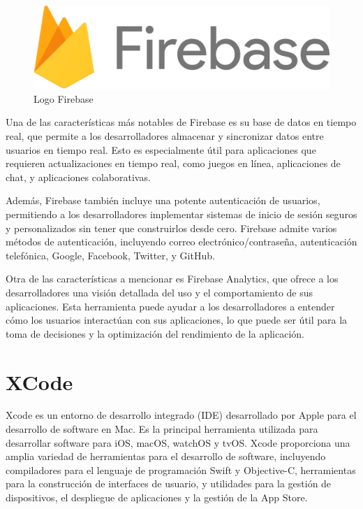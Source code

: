     \begin{figure}[H]
        \centering
        \includegraphics[width=.5\linewidth]{images/1280px-Firebase_Logo.svg.png}
        \caption{Logo Firebase}
        \label{fig:Logo Firebase}
    \end{figure}

    Una de las características más notables de Firebase es su base de datos en tiempo real, que permite a los desarrolladores almacenar y sincronizar datos entre usuarios en tiempo real. Esto es especialmente útil para aplicaciones que requieren actualizaciones en tiempo real, como juegos en línea, aplicaciones de chat, y aplicaciones colaborativas.

    Además, Firebase también incluye una potente autenticación de usuarios\cite{REF8}, permitiendo a los desarrolladores implementar sistemas de inicio de sesión seguros y personalizados sin tener que construirlos desde cero. Firebase admite varios métodos de autenticación, incluyendo correo electrónico/contraseña, autenticación telefónica, Google, Facebook, Twitter, y GitHub.

    Otra de las características a mencionar es Firebase Analytics, que ofrece a los desarrolladores una visión detallada del uso y el comportamiento de sus aplicaciones. Esta herramienta puede ayudar a los desarrolladores a entender cómo los usuarios interactúan con sus aplicaciones, lo que puede ser útil para la toma de decisiones y la optimización del rendimiento de la aplicación.
    
    \section{XCode}

    Xcode es un entorno de desarrollo integrado (IDE) desarrollado por Apple para el desarrollo de software en Mac. Es la principal herramienta utilizada para desarrollar software para iOS, macOS, watchOS y tvOS. Xcode proporciona una amplia variedad de herramientas para el desarrollo de software, incluyendo compiladores para el lenguaje de programación Swift y Objective-C, herramientas para la construcción de interfaces de usuario, y utilidades para la gestión de dispositivos, el despliegue de aplicaciones y la gestión de la App Store.

